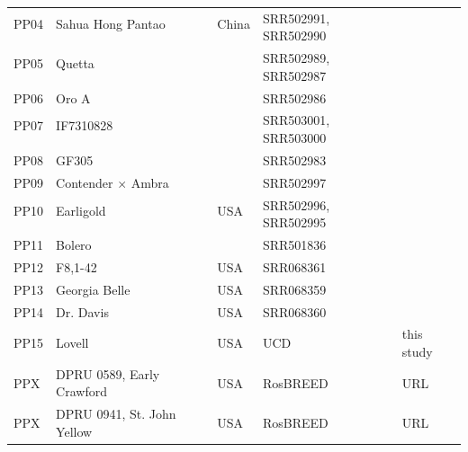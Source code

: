 \documentclass[12pt]{article}
\begin{document}
{\begin{center}
\begin{longtable}{lllll}
                 \\
                 PP04 &Sahua Hong Pantao &China &\multirow{2}{1cm}{SRR502991, SRR502990} &\citealt{verde2013high}\\
                 \\
                 PP05 &Quetta & &\multirow{2}{1cm}{SRR502989, SRR502987} &\citealt{verde2013high}\\
                 \\
                 PP06 &Oro A & &SRR502986 &\citealt{verde2013high}\\
                 PP07 &IF7310828 & &\multirow{2}{1cm}{SRR503001, SRR503000} &\citealt{verde2013high}\\
                 \\
                 PP08 &GF305 & &SRR502983 &\citealt{verde2013high}\\
                 PP09 &Contender $\times$ Ambra & &SRR502997 &\citealt{verde2013high}\\
                 PP10 &Earligold &USA &\multirow{2}{1cm}{SRR502996, SRR502995} &\citealt{verde2013high}\\
                 \\
                 PP11 &Bolero & &SRR501836 &\citealt{verde2013high}\\
                 PP12 &F8,1-42 &USA &SRR068361 &\citealt{ahmad2011whole} \\
                 PP13 &Georgia Belle &USA &SRR068359 &\citealt{ahmad2011whole} \\
                 PP14 &Dr. Davis &USA &SRR068360 &\citealt{ahmad2011whole} \\
                 PP15 &Lovell &USA &UCD &this study\\
                 PP{\color{red}X} &DPRU 0589, Early Crawford&USA &RosBREED &URL \\
                 PP{\color{red}X} &DPRU 0941, St. John Yellow &USA &RosBREED &URL \\

\end{longtable}
\end{center}}
\end{document}

